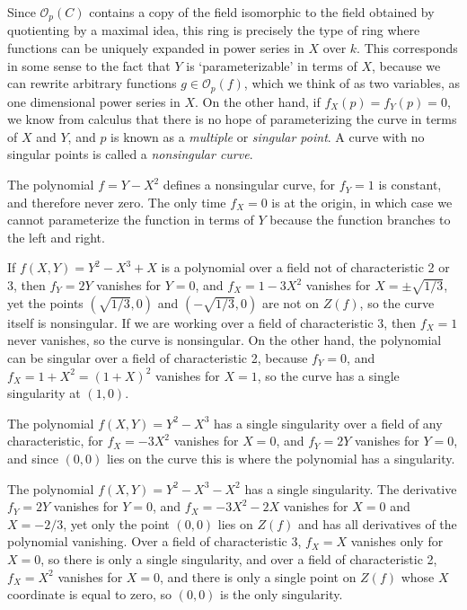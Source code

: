 Since $\mathcal{O}_p(C)$ contains a copy of the field isomorphic to the field obtained by quotienting by a maximal idea, this ring is precisely the type of ring where functions can be uniquely expanded in power series in $X$ over $k$. This corresponds in some sense to the fact that $Y$ is `parameterizable' in terms of $X$, because we can rewrite arbitrary functions $g \in \mathcal{O}_p(f)$, which we think of as two variables, as one dimensional power series in $X$. On the other hand, if $f_X(p) = f_Y(p) = 0$, we know from calculus that there is no hope of parameterizing the curve in terms of $X$ and $Y$, and $p$ is known as a \emph{multiple} or \emph{singular point}. A curve with no singular points is called a \emph{nonsingular curve}.

\begin{example}
    The polynomial $f = Y - X^2$ defines a nonsingular curve, for $f_Y = 1$ is constant, and therefore never zero. The only time $f_X = 0$ is at the origin, in which case we cannot parameterize the function in terms of $Y$ because the function branches to the left and right.
\end{example}

\begin{example}
    If $f(X,Y) = Y^2 - X^3 + X$ is a polynomial over a field not of characteristic 2 or 3, then $f_Y = 2Y$ vanishes for $Y = 0$, and $f_X = 1 - 3X^2$ vanishes for $X = \pm \sqrt{1/3}$, yet the points $(\sqrt{1/3},0)$ and $(-\sqrt{1/3},0)$ are not on $Z(f)$, so the curve itself is nonsingular. If we are working over a field of characteristic 3, then $f_X = 1$ never vanishes, so the curve is nonsingular. On the other hand, the polynomial can be singular over a field of characteristic 2, because $f_Y = 0$, and $f_X = 1 + X^2 = (1 + X)^2$ vanishes for $X = 1$, so the curve has a single singularity at $(1,0)$.
\end{example}

\begin{example}
    The polynomial $f(X,Y) = Y^2 - X^3$ has a single singularity over a field of any characteristic, for $f_X = -3X^2$ vanishes for $X = 0$, and $f_Y = 2Y$ vanishes for $Y = 0$, and since $(0,0)$ lies on the curve this is where the polynomial has a singularity.
\end{example}

\begin{example}
    The polynomial $f(X,Y) = Y^2 - X^3 - X^2$ has a single singularity. The derivative $f_Y = 2Y$ vanishes for $Y = 0$, and $f_X = -3X^2 - 2X$ vanishes for $X = 0$ and $X = -2/3$, yet only the point $(0,0)$ lies on $Z(f)$ and has all derivatives of the polynomial vanishing. Over a field of characteristic 3, $f_X = X$ vanishes only for $X = 0$, so there is only a single singularity, and over a field of characteristic 2, $f_X = X^2$ vanishes for $X = 0$, and there is only a single point on $Z(f)$ whose $X$ coordinate is equal to zero, so $(0,0)$ is the only singularity.
\end{example}

